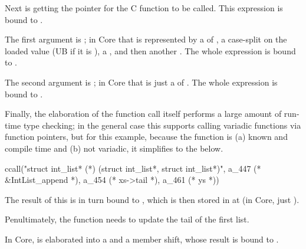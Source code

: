 
Next is getting the pointer for the C function to be called. This expression is
bound to .


The first argument is ; in Core that is represented by a
 of , a case-split on the loaded value %
(UB if it is ), a , %
and then another . The whole expression is bound %
to .


The second argument is ; in Core that is just a  %
of . The whole expression is bound to .


Finally, the elaboration of the function call itself performs a large amount of
run-time type checking; in the general case this supports calling variadic
functions via function pointers, but for this example, because the function is
(a) known and compile time and (b) not variadic, it simplifies to the below.

\begin{corecode}
ccall("struct int_list* (*) (struct int_list*, struct int_list*)",
      a_447 (* &IntList_append *),
      a_454 (* xs->tail *),
      a_461 (* ys *))
\end{corecode}

The result of this is in turn bound to , which is then
stored in at  (in Core, just ).


Penultimately, the  function needs to update the tail
of the first list.


In Core,  is elaborated into a  %
and a member shift, whose result is bound to .


